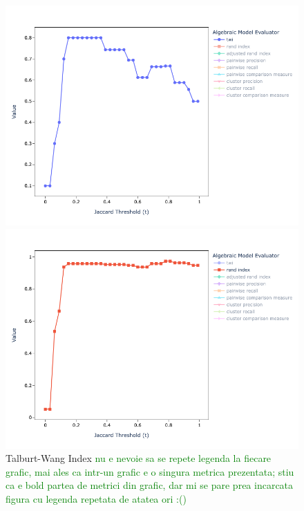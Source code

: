 \documentclass[lettersize,journal]{IEEEtran}
\begin{document}
    \begin{figure}
        \begin{minipage}{0.49\textwidth}
            \centering
            \includegraphics[width=\textwidth]{mini-alg-twi}
            \caption{Talburt-Wang Index
            \textcolor{green}{nu e nevoie sa se repete legenda la fiecare grafic, mai ales ca intr-un grafic e o singura metrica prezentata; stiu ca e bold partea de metrici din grafic, dar mi se pare prea incarcata figura cu legenda repetata de atatea ori :()}
            }
            \label{fig:mini-alg-twi}
        \end{minipage}    
        \begin{minipage}{0.49\textwidth}
            \centering
            \includegraphics[width=\textwidth]{mini-alg-rand}

\end{minipage}
\end{figure}
\end{document}
